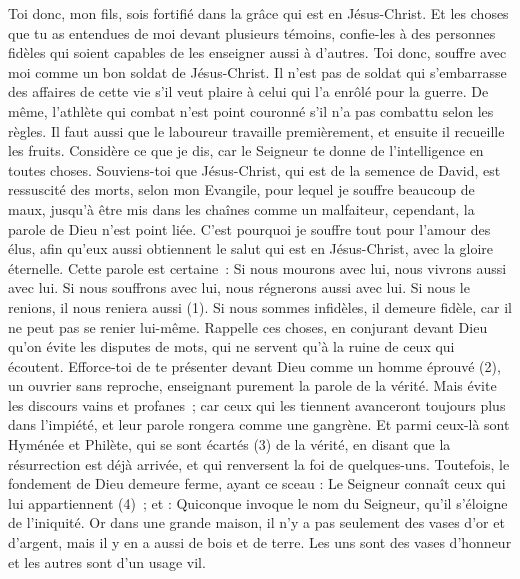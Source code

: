 \begin{multicols}{2}
\VerseOne{}Toi donc, mon fils, sois fortifié dans la grâce qui est en Jésus-Christ.
Et les choses que tu as entendues de moi devant plusieurs témoins, confie-les à des personnes fidèles qui soient capables de les enseigner aussi à d'autres.
Toi donc, souffre avec moi comme un bon soldat de Jésus-Christ.
Il n’est pas de soldat qui s'embarrasse des affaires de cette vie s’il veut plaire à celui qui l'a enrôlé pour la guerre.
De même, l’athlète qui combat n'est point couronné s'il n'a pas combattu selon les règles.
Il faut aussi que le laboureur travaille premièrement, et ensuite il recueille les fruits.
Considère ce que je dis, car le Seigneur te donne de l’intelligence en toutes choses.
Souviens-toi que Jésus-Christ, qui est de la semence de David, est ressuscité des morts, selon mon Evangile,
pour lequel je souffre beaucoup de maux, jusqu'à être mis dans les chaînes comme un malfaiteur, cependant, la parole de Dieu n'est point liée.
C'est pourquoi je souffre tout pour l'amour des élus, afin qu'eux aussi obtiennent le salut qui est en Jésus-Christ, avec la gloire éternelle.
Cette parole est certaine : Si nous mourons avec lui, nous vivrons aussi avec lui.
Si nous souffrons avec lui, nous régnerons aussi avec lui. Si nous le renions, il nous reniera aussi (1).
Si nous sommes infidèles, il demeure fidèle, car il ne peut pas se renier lui-même.
Rappelle ces choses, en conjurant devant Dieu qu'on évite les disputes de mots, qui ne servent qu'à la ruine de ceux qui écoutent.
Efforce-toi de te présenter devant Dieu comme un homme éprouvé (2), un ouvrier sans reproche, enseignant purement la parole de la vérité.
Mais évite les discours vains et profanes ; car ceux qui les tiennent avanceront toujours plus dans l'impiété,
et leur parole rongera comme une gangrène. Et parmi ceux-là sont Hyménée et Philète,
qui se sont écartés (3) de la vérité, en disant que la résurrection est déjà arrivée, et qui renversent la foi de quelques-uns.
Toutefois, le fondement de Dieu demeure ferme, ayant ce sceau : Le Seigneur connaît ceux qui lui appartiennent (4) ; et : Quiconque invoque le nom du Seigneur, qu'il s’éloigne de l'iniquité.
Or dans une grande maison, il n'y a pas seulement des vases d'or et d'argent, mais il y en a aussi de bois et de terre. Les uns sont des vases d’honneur et les autres sont d’un usage vil.

\end{multicols}
